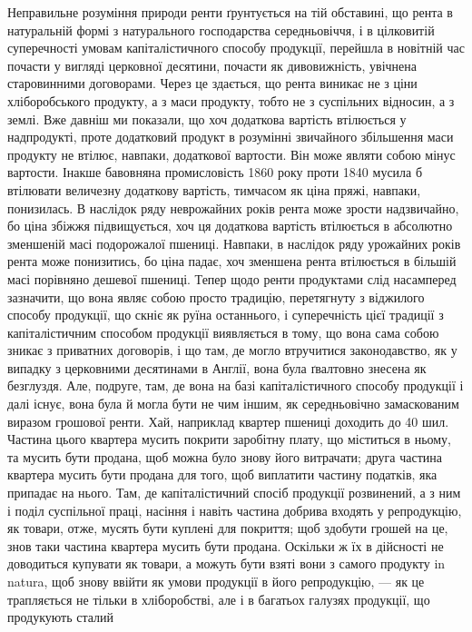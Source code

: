 Неправильне розуміння природи ренти ґрунтується на тій обставині, що
рента в натуральній формі з натурального господарства середньовіччя, і в цілковитій
суперечності умовам капіталістичного способу продукції, перейшла в новітній
час почасти у вигляді церковної десятини, почасти як дивовижність, увічнена
старовинними договорами. Через це здається, що рента виникає не з ціни
хліборобського продукту, а з маси продукту, тобто не з суспільних відносин,
а з землі. Вже давніш ми показали, що хоч додаткова вартість втілюється у
надпродукті, проте додатковий продукт в розумінні звичайного збільшення маси
продукту не втілює, навпаки, додаткової вартости. Він може являти собою мінус
вартости. Інакше бавовняна промисловість 1860 року проти 1840 мусила б
втілювати величезну додаткову вартість, тимчасом як ціна пряжі, навпаки, понизилась. В наслідок ряду
неврожайних років рента може зрости надзвичайно,
бо ціна збіжжя підвищується, хоч ця додаткова вартість втілюється в абсолютно
зменшеній масі подорожалої пшениці. Навпаки, в наслідок ряду урожайних
років рента може понизитись, бо ціна падає, хоч зменшена рента втілюється в
більшій масі порівняно дешевої пшениці. Тепер щодо ренти продуктами слід
насамперед зазначити, що вона являє собою просто традицію, перетягнуту з віджилого
способу продукції, що скніє як руїна останнього, і суперечність цієї
традиції з капіталістичним способом продукції виявляється в тому, що вона
сама собою зникає з приватних договорів, і що там, де могло втручитися законодавство,
як у випадку з церковними десятинами в Англії, вона була ґвалтовно
знесена як безглуздя. Але, подруге, там, де вона на базі капіталістичного
способу продукції і далі існує, вона була й могла бути не чим іншим, як
середньовічно замаскованим виразом грошової ренти. Хай, наприклад квартер
пшениці доходить до 40 шил. Частина цього квартера мусить покрити заробітну
плату, що міститься в ньому, та мусить бути продана, щоб можна було знову
його витрачати; друга частина квартера мусить бути продана для того, щоб виплатити
частину податків, яка припадає на нього. Там, де капіталістичний
спосіб продукції розвинений, а з ним і поділ суспільної праці, насіння і навіть
частина добрива входять у репродукцію, як товари, отже, мусять бути куплені
для покриття; щоб здобути грошей на це, знов таки частина квартера мусить
бути продана. Оскільки ж їх в дійсності не доводиться купувати як товари,
а можуть бути взяті вони з самого продукту in natura, щоб знову
ввійти як умови продукції в його репродукцію, — як це трапляється не тільки
в хліборобстві, але і в багатьох галузях продукції, що продукують сталий